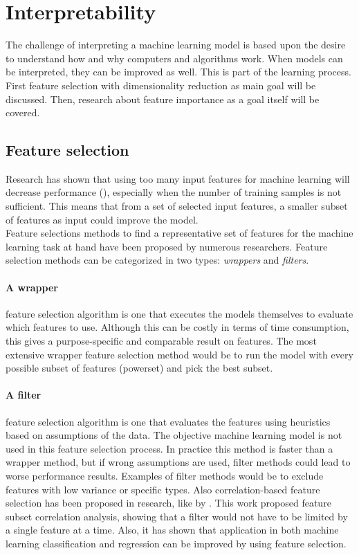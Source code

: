 \section{Interpretability}
The challenge of interpreting a machine learning model is based upon the desire to understand how and why computers and algorithms work. When models can be interpreted, they can be improved as well. This is part of the learning process. First feature selection with dimensionality reduction as main goal will be discussed. Then, research about feature importance as a goal itself will be covered.

\subsection{Feature selection}
Research has shown that using too many input features for machine learning will decrease performance (\cite{Trunk1979-sq}), especially when the number of training samples is not sufficient. This means that from a set of selected input features, a smaller subset of features as input could improve the model. 
\\Feature selections methods to find a representative set of features for the machine learning task at hand have been proposed by numerous researchers. Feature selection methods can be categorized in two types: \textit{wrappers} and \textit{filters}. 
\paragraph{A wrapper} feature selection algorithm is one that executes the models themselves to evaluate which features to use. Although this can be costly in terms of time consumption, this gives a purpose-specific and comparable result on features. The most extensive wrapper feature selection method would be to run the model with every possible subset of features (powerset) and pick the best subset.

\paragraph{A filter} feature selection algorithm is one that evaluates the features using heuristics based on assumptions of the data. The objective machine learning model is not used in this feature selection process. In practice this method is faster than a wrapper method, but if wrong assumptions are used, filter methods could lead to worse performance results. Examples of filter methods would be to exclude features with low variance or specific types. Also correlation-based feature selection has been proposed in research, like by \cite{Hall2000-bx}. This work proposed feature subset correlation analysis, showing that a filter would not have to be limited by a single feature at a time. Also, it has shown that application in both machine learning classification and regression can be improved by using feature selection.

